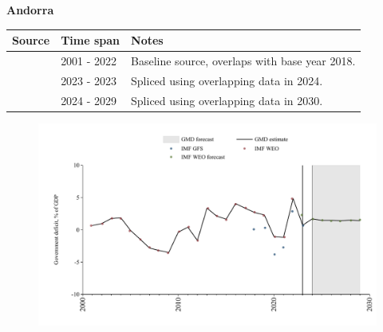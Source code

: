 \documentclass[12pt,a4paper,landscape]{article}
\begin{document}
\begin{adjustbox}{max totalsize={\paperwidth}{\paperheight},center}
\begin{minipage}[t][\textheight][t]{\textwidth}
\vspace*{0.5cm}
{}
\begin{center}
{\Large\bfseries Andorra}
\end{center}
\vspace{0.5cm}
\begin{table}[H]
\centering
\small
\begin{tabular}{|l|l|l|}
\hline
\textbf{Source} & \textbf{Time span} & \textbf{Notes} \\
\hline
\rowcolor{white}\cite{IMF_WEO}& 2001 - 2022 &Baseline source, overlaps with base year 2018.\\
\rowcolor{lightgray}\cite{IMF_GFS}& 2023 - 2023 &Spliced using overlapping data in 2024.\\
\rowcolor{white}\cite{IMF_WEO_forecast}& 2024 - 2029 &Spliced using overlapping data in 2030.\\
\hline
\end{tabular}
\end{table}
\begin{figure}[H]
\centering
\includegraphics[width=\textwidth,height=0.6\textheight,keepaspectratio]{graphs/AND_govdef_GDP.pdf}
\end{figure}
\end{minipage}
\end{adjustbox}
\end{document}
